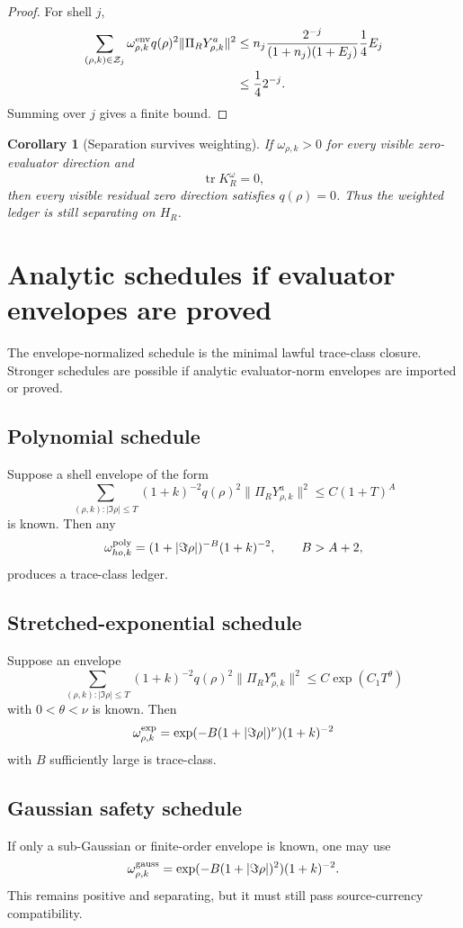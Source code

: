 \documentclass[11pt]{article}
\newtheorem{corollary}{Corollary}
\begin{document}
\begin{proof}
For shell $j$,
\[
\begin{aligned}
\sum_{(\rho,k)\in\mathcal Z_j}\omega^{\rm env}_{\rho,k}q(\rho)^2\|\Pi_RY^a_{\rho,k}\|^2
&\le
n_j\frac{2^{-j}}{(1+n_j)(1+E_j)}\frac14 E_j \\
&\le \frac14 2^{-j}.
\end{aligned}
\]
Summing over $j$ gives a finite bound.
\end{proof}

\begin{corollary}[Separation survives weighting]
If $\omega_{\rho,k}>0$ for every visible zero-evaluator direction and
\[
  \operatorname{tr}K_R^\omega=0,
\]
then every visible residual zero direction satisfies $q(\rho)=0$. Thus the weighted ledger is still separating on $H_R$.
\end{corollary}

\section{Analytic schedules if evaluator envelopes are proved}
The envelope-normalized schedule is the minimal lawful trace-class closure. Stronger schedules are possible if analytic evaluator-norm envelopes are imported or proved.

\subsection{Polynomial schedule}
Suppose a shell envelope of the form
\[
  \sum_{(\rho,k):|\Im\rho|\le T}
  (1+k)^{-2}q(\rho)^2\|\Pi_RY^a_{\rho,k}\|^2
  \le C(1+T)^A
\]
is known. Then any
\[
  \omega_{
ho,k}^{\rm poly}=(1+|\Im\rho|)^{-B}(1+k)^{-2},
  \qquad B>A+2,
\]
produces a trace-class ledger.

\subsection{Stretched-exponential schedule}
Suppose an envelope
\[
  \sum_{(\rho,k):|\Im\rho|\le T}
  (1+k)^{-2}q(\rho)^2\|\Pi_RY^a_{\rho,k}\|^2
  \le C\exp(C_1T^\theta)
\]
with $0<\theta<\nu$ is known. Then
\[
  \omega_{\rho,k}^{\rm exp}=\exp(-B(1+|\Im\rho|)^\nu)(1+k)^{-2}
\]
with $B$ sufficiently large is trace-class.

\subsection{Gaussian safety schedule}
If only a sub-Gaussian or finite-order envelope is known, one may use
\[
  \omega_{\rho,k}^{\rm gauss}=\exp(-B(1+|\Im\rho|)^2)(1+k)^{-2}.
\]
This remains positive and separating, but it must still pass source-currency compatibility.
\end{document}
